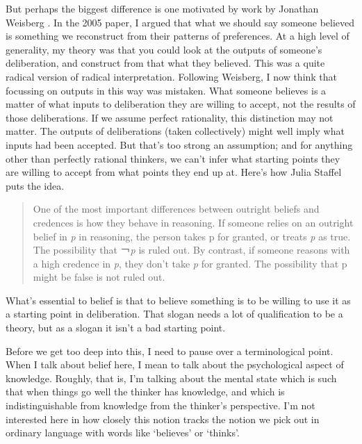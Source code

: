 \documentclass[
  11pt,
]{book}
\begin{document}
But perhaps the biggest difference is one motivated by work by Jonathan Weisberg \citetext{\citeyear{Weisberg2013}; \citeyear{Weisberg2020}}. In the 2005 paper, I argued that what we should say someone believed is something we reconstruct from their patterns of preferences. At a high level of generality, my theory was that you could look at the outputs of someone's deliberation, and construct from that what they believed. This was a quite radical version of radical interpretation. Following Weisberg, I now think that focussing on outputs in this way was mistaken. What someone believes is a matter of what inputs to deliberation they are willing to accept, not the results of those deliberations. If we assume perfect rationality, this distinction may not matter. The outputs of deliberations (taken collectively) might well imply what inputs had been accepted. But that's too strong an assumption; and for anything other than perfectly rational thinkers, we can't infer what starting points they are willing to accept from what points they end up at. Here's how Julia Staffel puts the idea.

\begin{quote}
One of the most important differences between outright beliefs and credences is how they behave in reasoning. If someone relies on an outright belief in \emph{p} in reasoning, the person takes p for granted, or treats \emph{p} as true. The possibility that ￢\emph{p} is ruled out. By contrast, if someone reasons with a high credence in \emph{p}, they don't take \emph{p} for granted. The possibility that p might be false is not ruled out. \citep[939]{Staffel2019}
\end{quote}

What's essential to belief is that to believe something is to be willing to use it as a starting point in deliberation. That slogan needs a lot of qualification to be a theory, but as a slogan it isn't a bad starting point.

Before we get too deep into this, I need to pause over a terminological point. When I talk about belief here, I mean to talk about the psychological aspect of knowledge. Roughly, that is, I'm talking about the mental state which is such that when things go well the thinker has knowledge, and which is indistinguishable from knowledge from the thinker's perspective. I'm not interested here in how closely this notion tracks the notion we pick out in ordinary language with words like `believes' or `thinks'.
\end{document}
